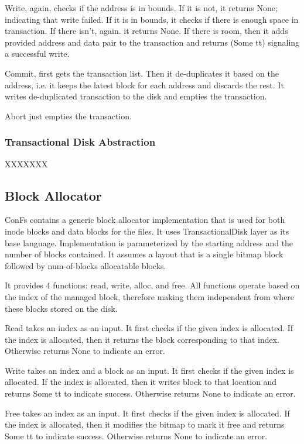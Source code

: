 Write, again, checks if the address is in bounds. If it is not, it returns None; indicating that write failed. If it is in bounds, it checks if there is enough space in transaction. If there isn't, again. it returns None. If there is room, then it adds provided address and data pair to the transaction and returns (Some tt) signaling a successful write.

Commit, first gets the transaction list. Then it de-duplicates it based on the address, i.e. it keeps the latest block for each address and discards the rest. It writes de-duplicated transaction to the disk and empties the transaction.

Abort just empties the transaction.

\subsubsection{Transactional Disk Abstraction}
{\color{red} XXXXXXX}

\subsection{Block Allocator}
ConFs contains a generic block allocator implementation that is used for both inode blocks and data blocks for the files. It uses TransactionalDisk layer as its base language. Implementation is parameterized by the starting address and the number of blocks contained. It assumes a layout that is a single bitmap block followed by num-of-blocks allocatable blocks.

It provides 4 functions: read, write, alloc, and free. All functions operate based on the index of the managed block, therefore making them independent from where these blocks stored on the disk.

Read takes an index as an input. It first checks if the given index is allocated. If the index is allocated, then it returns the block corresponding to that index. Otherwise returns None to indicate an error.

Write takes an index and a block as an input. It first checks if the given index is allocated. If the index is allocated, then it writes block to that location and returns Some tt to indicate success. Otherwise returns None to indicate an error.

Free takes an index as an input. It first checks if the given index is allocated. If the index is allocated, then it modifies the bitmap to mark it free and returns Some tt to indicate success. Otherwise returns None to indicate an error.

